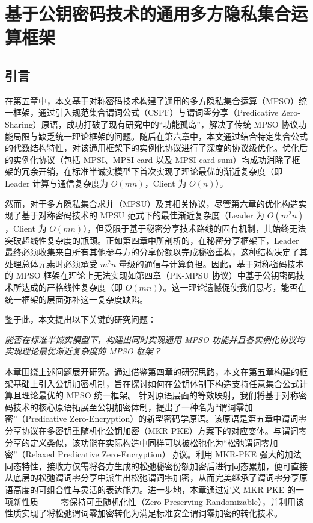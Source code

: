 \chapter{基于公钥密码技术的通用多方隐私集合运算框架}

\section{引言}

在第五章中，本文基于对称密码技术构建了通用的多方隐私集合运算（MPSO）统一框架，通过引入规范集合谓词公式（CSPF）与谓词零分享（Predicative Zero-Sharing）原语，成功打破了现有研究中的“功能孤岛”，解决了传统 MPSO 协议功能局限与缺乏统一理论框架的问题。随后在第六章中，本文通过结合特定集合公式的代数结构特性，对该通用框架下的实例化协议进行了深度的协议级优化。优化后的实例化协议（包括 MPSI、MPSI-card 以及 MPSI-card-sum）均成功消除了框架的冗余开销，在标准半诚实模型下首次实现了理论最优的渐近复杂度（即 Leader 计算与通信复杂度为 $O(mn)$，Client 为 $O(n)$）。

然而，对于多方隐私集合求并（MPSU）及其相关协议，尽管第六章的优化构造实现了基于对称密码技术的 MPSU 范式下的最佳渐近复杂度（Leader 为 $O(m^2 n)$，Client 为 $O(mn)$），但受限于基于秘密分享技术路线的固有机制，其始终无法突破超线性复杂度的瓶颈。正如第四章中所剖析的，在秘密分享框架下，Leader 最终必须收集来自所有其他参与方的分享份额以完成秘密重构，这种结构决定了其处理总体元素时必须承受 $m^2 n$ 量级的通信与计算负担。因此，基于对称密码技术的 MPSO 框架在理论上无法实现如第四章（PK-MPSU 协议）中基于公钥密码技术所达成的严格线性复杂度（即 $O(mn)$）。这一理论遗憾促使我们思考，能否在统一框架的层面弥补这一复杂度缺陷。

鉴于此，本文提出以下关键的研究问题：
\begin{center}
\emph{能否在标准半诚实模型下，构建出同时实现通用 MPSO 功能并且各实例化协议均实现理论最优渐近复杂度的 MPSO 框架？}
\end{center}

本章围绕上述问题展开研究。通过借鉴第四章的研究思路，本文在第五章构建的框架基础上引入公钥加密机制，旨在探讨如何在公钥体制下构造支持任意集合公式计算且理论最优的 MPSO 统一框架。
针对原语层面的等效映射，我们将基于对称密码技术的核心原语拓展至公钥加密体制，提出了一种名为“谓词零加密”（Predicative Zero-Encryption）的新型密码学原语。该原语是第五章中谓词零分享协议在多密钥重随机化公钥加密（MKR-PKE）方案下的对应变体。与谓词零分享的定义类似，该功能在实际构造中同样可以被松弛化为“松弛谓词零加密”（Relaxed Predicative Zero-Encryption）协议。利用 MKR-PKE 强大的加法同态特性，接收方仅需将各方生成的松弛秘密份额加密后进行同态累加，便可直接从底层的松弛谓词零分享中派生出松弛谓词零加密，从而完美继承了谓词零分享原语高度的可组合性与灵活的表达能力。进一步地，本章通过定义 MKR-PKE 的一项新性质 —— 零保持可重随机化性（Zero-Preserving Randomizable），并利用该性质实现了将松弛谓词零加密转化为满足标准安全谓词零加密的转化技术。

